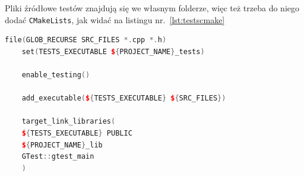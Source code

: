 Pliki źródłowe testów znajdują się we własnym folderze, więc też trzeba do niego dodać \texttt{CMakeLists}, jak widać na listingu nr.~\ref{lst:testscmake}

\begin{lstlisting}[caption=Dodanie Google Test do projektu, label={lst:testscmake}, language=C++]
	file(GLOB_RECURSE SRC_FILES *.cpp *.h)
	set(TESTS_EXECUTABLE ${PROJECT_NAME}_tests)
	
	enable_testing()
	
	add_executable(${TESTS_EXECUTABLE} ${SRC_FILES})
	
	target_link_libraries(
	${TESTS_EXECUTABLE} PUBLIC
	${PROJECT_NAME}_lib
	GTest::gtest_main
	)
	
\end{lstlisting}